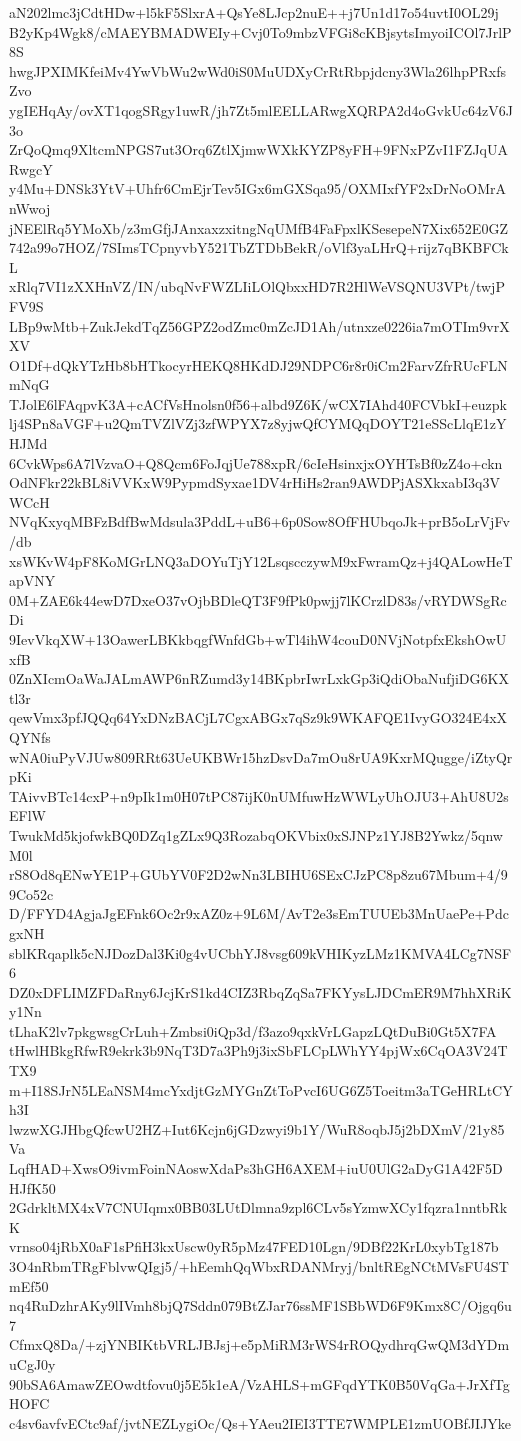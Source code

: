aN202lmc3jCdtHDw+l5kF5SlxrA+QsYe8LJcp2nuE++j7Un1d17o54uvtI0OL29j
B2yKp4Wgk8/cMAEYBMADWEIy+Cvj0To9mbzVFGi8cKBjsytsImyoiICOl7JrlP8S
hwgJPXIMKfeiMv4YwVbWu2wWd0iS0MuUDXyCrRtRbpjdcny3Wla26lhpPRxfsZvo
ygIEHqAy/ovXT1qogSRgy1uwR/jh7Zt5mlEELLARwgXQRPA2d4oGvkUc64zV6J3o
ZrQoQmq9XltcmNPGS7ut3Orq6ZtlXjmwWXkKYZP8yFH+9FNxPZvI1FZJqUARwgcY
y4Mu+DNSk3YtV+Uhfr6CmEjrTev5IGx6mGXSqa95/OXMIxfYF2xDrNoOMrAnWwoj
jNEElRq5YMoXb/z3mGfjJAnxaxzxitngNqUMfB4FaFpxlKSesepeN7Xix652E0GZ
742a99o7HOZ/7SImsTCpnyvbY521TbZTDbBekR/oVlf3yaLHrQ+rijz7qBKBFCkL
xRlq7VI1zXXHnVZ/IN/ubqNvFWZLIiLOlQbxxHD7R2HlWeVSQNU3VPt/twjPFV9S
LBp9wMtb+ZukJekdTqZ56GPZ2odZmc0mZcJD1Ah/utnxze0226ia7mOTIm9vrXXV
O1Df+dQkYTzHb8bHTkocyrHEKQ8HKdDJ29NDPC6r8r0iCm2FarvZfrRUcFLNmNqG
TJolE6lFAqpvK3A+cACfVsHnolsn0f56+albd9Z6K/wCX7IAhd40FCVbkI+euzpk
lj4SPn8aVGF+u2QmTVZlVZj3zfWPYX7z8yjwQfCYMQqDOYT21eSScLlqE1zYHJMd
6CvkWps6A7lVzvaO+Q8Qcm6FoJqjUe788xpR/6cIeHsinxjxOYHTsBf0zZ4o+ckn
OdNFkr22kBL8iVVKxW9PypmdSyxae1DV4rHiHs2ran9AWDPjASXkxabI3q3VWCcH
NVqKxyqMBFzBdfBwMdsula3PddL+uB6+6p0Sow8OfFHUbqoJk+prB5oLrVjFv/db
xsWKvW4pF8KoMGrLNQ3aDOYuTjY12LsqscczywM9xFwramQz+j4QALowHeTapVNY
0M+ZAE6k44ewD7DxeO37vOjbBDleQT3F9fPk0pwjj7lKCrzlD83s/vRYDWSgRcDi
9IevVkqXW+13OawerLBKkbqgfWnfdGb+wTl4ihW4couD0NVjNotpfxEkshOwUxfB
0ZnXIcmOaWaJALmAWP6nRZumd3y14BKpbrIwrLxkGp3iQdiObaNufjiDG6KXtl3r
qewVmx3pfJQQq64YxDNzBACjL7CgxABGx7qSz9k9WKAFQE1IvyGO324E4xXQYNfs
wNA0iuPyVJUw809RRt63UeUKBWr15hzDsvDa7mOu8rUA9KxrMQugge/iZtyQrpKi
TAivvBTc14cxP+n9pIk1m0H07tPC87ijK0nUMfuwHzWWLyUhOJU3+AhU8U2sEFlW
TwukMd5kjofwkBQ0DZq1gZLx9Q3RozabqOKVbix0xSJNPz1YJ8B2Ywkz/5qnwM0l
rS8Od8qENwYE1P+GUbYV0F2D2wNn3LBIHU6SExCJzPC8p8zu67Mbum+4/99Co52c
D/FFYD4AgjaJgEFnk6Oc2r9xAZ0z+9L6M/AvT2e3sEmTUUEb3MnUaePe+PdcgxNH
sblKRqaplk5cNJDozDal3Ki0g4vUCbhYJ8vsg609kVHIKyzLMz1KMVA4LCg7NSF6
DZ0xDFLIMZFDaRny6JcjKrS1kd4CIZ3RbqZqSa7FKYysLJDCmER9M7hhXRiKy1Nn
tLhaK2lv7pkgwsgCrLuh+Zmbsi0iQp3d/f3azo9qxkVrLGapzLQtDuBi0Gt5X7FA
tHwlHBkgRfwR9ekrk3b9NqT3D7a3Ph9j3ixSbFLCpLWhYY4pjWx6CqOA3V24TTX9
m+I18SJrN5LEaNSM4mcYxdjtGzMYGnZtToPvcI6UG6Z5Toeitm3aTGeHRLtCYh3I
lwzwXGJHbgQfcwU2HZ+Iut6Kcjn6jGDzwyi9b1Y/WuR8oqbJ5j2bDXmV/21y85Va
LqfHAD+XwsO9ivmFoinNAoswXdaPs3hGH6AXEM+iuU0UlG2aDyG1A42F5DHJfK50
2GdrkltMX4xV7CNUIqmx0BB03LUtDlmna9zpl6CLv5sYzmwXCy1fqzra1nntbRkK
vrnso04jRbX0aF1sPfiH3kxUscw0yR5pMz47FED10Lgn/9DBf22KrL0xybTg187b
3O4nRbmTRgFblvwQIgj5/+hEemhQqWbxRDANMryj/bnltREgNCtMVsFU4STmEf50
nq4RuDzhrAKy9lIVmh8bjQ7Sddn079BtZJar76ssMF1SBbWD6F9Kmx8C/Ojgq6u7
CfmxQ8Da/+zjYNBIKtbVRLJBJsj+e5pMiRM3rWS4rROQydhrqGwQM3dYDmuCgJ0y
90bSA6AmawZEOwdtfovu0j5E5k1eA/VzAHLS+mGFqdYTK0B50VqGa+JrXfTgHOFC
c4sv6avfvECtc9af/jvtNEZLygiOc/Qs+YAeu2IEI3TTE7WMPLE1zmUOBfJIJYke
